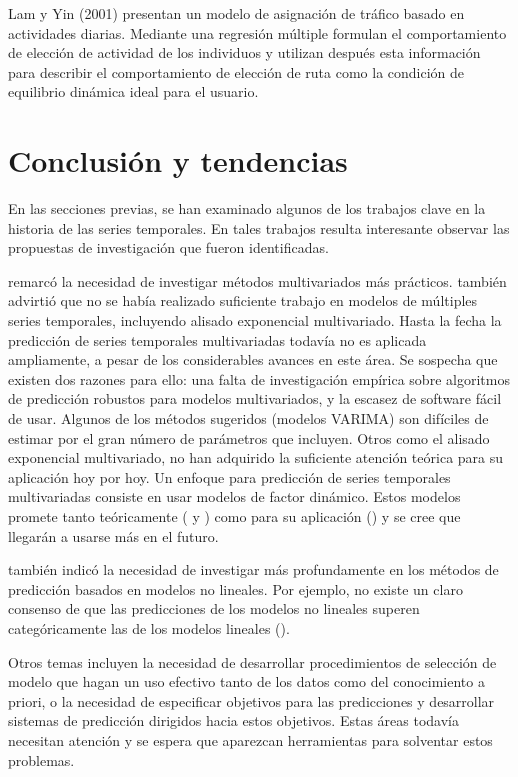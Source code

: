 \documentclass{llncs}
\begin{document}
Lam y Yin (2001) \cite{lam2001activity} presentan un modelo de asignación de tráfico basado en actividades diarias. Mediante una regresión múltiple formulan el comportamiento de elección de actividad de los individuos y utilizan después esta información para describir el comportamiento de elección de ruta como la condición de equilibrio dinámica ideal para el usuario.


\section{Conclusión y tendencias}

En las secciones previas, se han examinado algunos de los trabajos clave en la historia de las series temporales. En tales trabajos resulta interesante observar las propuestas de investigación que fueron identificadas. 

\cite{Chatfield198819} remarcó la necesidad de investigar métodos multivariados más prácticos. \cite{Ord1988389} también advirtió que no se había realizado suficiente trabajo en modelos de múltiples series temporales, incluyendo alisado exponencial multivariado. Hasta la fecha la predicción de series temporales multivariadas todavía no es aplicada ampliamente, a pesar  de los considerables avances en este área. Se sospecha que existen dos razones para ello: una falta de investigación empírica sobre algoritmos de predicción robustos para modelos multivariados, y la escasez de software fácil de usar. Algunos de los métodos sugeridos (modelos VARIMA) son difíciles de estimar por el gran número de parámetros que incluyen. Otros como el alisado exponencial multivariado, no han adquirido la suficiente atención teórica para su aplicación hoy por hoy. Un enfoque para predicción de series temporales multivariadas consiste en usar modelos de factor dinámico. Estos modelos promete tanto teóricamente (\cite{Forni2005830} y \cite{Stock20021167}) como para su aplicación (\cite{Pena2004291}) y se cree que llegarán a usarse más en el futuro.

\cite{Ord1988389} también indicó la necesidad de investigar más profundamente en los métodos de predicción basados en modelos no lineales. Por ejemplo, no existe un claro consenso de que las predicciones de los modelos no lineales superen categóricamente las de los modelos lineales (\cite{Stock19991}). 

Otros temas incluyen la necesidad de desarrollar procedimientos de selección de modelo que hagan un uso efectivo tanto de los datos como del conocimiento a priori, o la necesidad de especificar objetivos para las predicciones y desarrollar sistemas de predicción dirigidos hacia estos objetivos. Estas áreas todavía necesitan atención y se espera que aparezcan herramientas para solventar estos problemas. %
\end{document}
